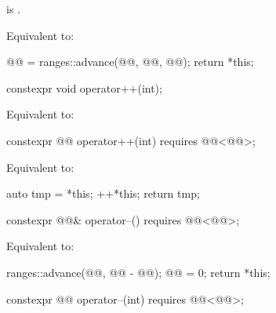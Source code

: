 \begin{itemdescr}
\pnum
\expects
{} is .

\pnum
\effects
Equivalent to:
\begin{codeblock}
@@ = ranges::advance(@@, @@, @@);
return *this;
\end{codeblock}
\end{itemdescr}

%
\begin{itemdecl}
constexpr void operator++(int);
\end{itemdecl}

\begin{itemdescr}
\pnum
\effects
Equivalent to: 
\end{itemdescr}

%
\begin{itemdecl}
constexpr @@ operator++(int) requires @@<@@>;
\end{itemdecl}

\begin{itemdescr}
\pnum
\effects
Equivalent to:
\begin{codeblock}
auto tmp = *this;
++*this;
return tmp;
\end{codeblock}
\end{itemdescr}

%
\begin{itemdecl}
constexpr @@& operator--() requires @@<@@>;
\end{itemdecl}

\begin{itemdescr}
\pnum
\effects
Equivalent to:
\begin{codeblock}
ranges::advance(@@, @@ - @@);
@@ = 0;
return *this;
\end{codeblock}
\end{itemdescr}

%
\begin{itemdecl}
constexpr @@ operator--(int) requires @@<@@>;
\end{itemdecl}

